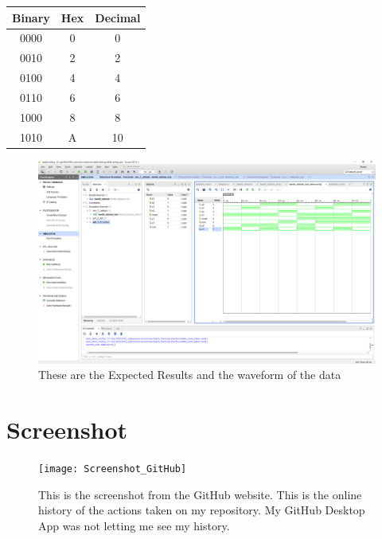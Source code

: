 \documentclass[11pt]{article}
\begin{document}
\begin{center}
	\begin{tabular}{c|c|c}
		\toprule
		Binary & Hex & Decimal \\
		\midrule
		 0000  &  0  &    0 \\
		 0010  &  2  &    2 \\
		 0100  &  4  &    4 \\
		 0110  &  6  &    6 \\
		 1000  &  8  &    8 \\
		 1010  &  A  &    10 \\
		\bottomrule
	\end{tabular} 
\begin{figure}[ht]\centering
\includegraphics[width=\textwidth,trim=540 455 15 130,clip]{lab1_example_screenshot}
\caption{These are the Expected Results and the waveform of the data}
\label{fig:results_and_waveform}
\end{figure}
\end{center}

\section*{}
\section*{}
\section*{}
\section*{Screenshot}

\begin{figure}[ht]\centering
	\texttt{[image: Screenshot\_GitHub]}
	\caption{This is the screenshot from the GitHub website. This is the online history of the actions taken on my repository. My GitHub Desktop App was not letting me see my history.}
	\label{fig:Screenshot_GitHub}
\end{figure}
\end{document}
